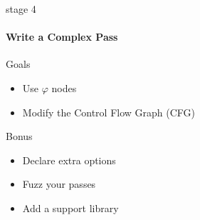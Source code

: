 \documentclass[14pt]{beamer}
\begin{document}
    \begin{frame}{stage 4}

        \framesubtitle{Write a Complex Pass}

        \begin{block}{Goals}
            \begin{itemize}
                \item Use $\varphi$ nodes
                \item Modify the Control Flow Graph (CFG)
            \end{itemize}

        \end{block}

        \begin{alertblock}{Bonus}
            \begin{itemize}
                \item Declare extra options
                \item Fuzz your passes
                \item Add a support library
            \end{itemize}
        \end{alertblock}

    \end{frame}
\end{document}
